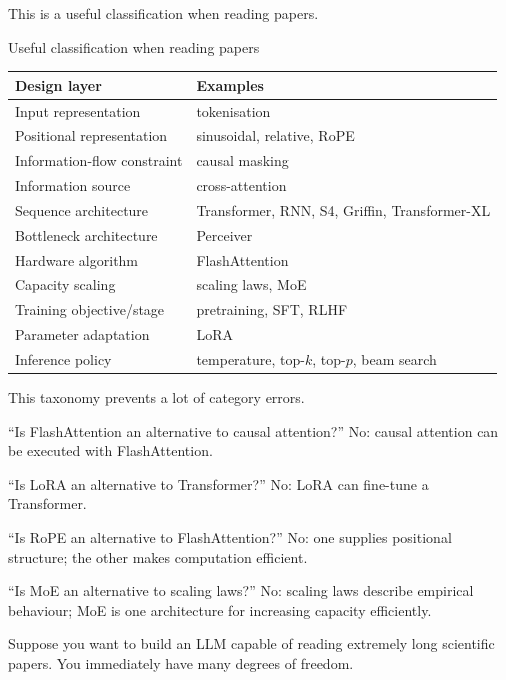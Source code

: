 This is a useful classification when reading papers.

\begin{center}
\small
\caption{Useful classification when reading papers}
\begin{tabularx}{.92\linewidth}{@{}L{.31\linewidth}Y@{}}
\toprule
\textbf{Design layer} & \textbf{Examples} \\
\midrule
Input representation & tokenisation \\
Positional representation & sinusoidal, relative, RoPE \\
Information-flow constraint & causal masking \\
Information source & cross-attention \\
Sequence architecture & Transformer, RNN, S4, Griffin, Transformer-XL \\
Bottleneck architecture & Perceiver \\
Hardware algorithm & FlashAttention \\
Capacity scaling & scaling laws, MoE \\
Training objective/stage & pretraining, SFT, RLHF \\
Parameter adaptation & LoRA \\
Inference policy & temperature, top-$k$, top-$p$, beam search \\
\bottomrule
\end{tabularx}
\end{center}

This taxonomy prevents a lot of category errors.

\begin{calloutexample}
``Is FlashAttention an alternative to causal attention?'' No: causal attention can be executed with FlashAttention.

``Is LoRA an alternative to Transformer?'' No: LoRA can fine-tune a Transformer.

``Is RoPE an alternative to FlashAttention?'' No: one supplies positional structure; the other makes computation efficient.

``Is MoE an alternative to scaling laws?'' No: scaling laws describe empirical behaviour; MoE is one architecture for increasing capacity efficiently.
\end{calloutexample}


Suppose you want to build an LLM capable of reading extremely long scientific papers.
You immediately have many degrees of freedom.

